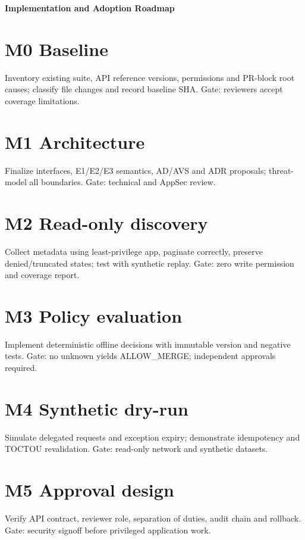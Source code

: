 \documentclass[11pt,letterpaper]{article}
\begin{document}
\begin{center}
{\LARGE\bfseries Implementation and Adoption Roadmap}\par
\vspace{5pt}{\large Sequenced gates from documentation to controlled pilot}\par
\vspace{9pt}{\small Engineering reference | Proposed design | Not a deployment or approval record}\par
\end{center}
\tableofcontents
\clearpage
\section{M0 Baseline}
Inventory existing suite, API reference versions, permissions and PR-block root causes; classify file changes and record baseline SHA. Gate: reviewers accept coverage limitations.


\section{M1 Architecture}
Finalize interfaces, E1/E2/E3 semantics, AD/AVS and ADR proposals; threat-model all boundaries. Gate: technical and AppSec review.


\section{M2 Read-only discovery}
Collect metadata using least-privilege app, paginate correctly, preserve denied/truncated states; test with synthetic replay. Gate: zero write permission and coverage report.


\section{M3 Policy evaluation}
Implement deterministic offline decisions with immutable version and negative tests. Gate: no unknown yields ALLOW\_MERGE; independent approvals required.


\section{M4 Synthetic dry-run}
Simulate delegated requests and exception expiry; demonstrate idempotency and TOCTOU revalidation. Gate: read-only network and synthetic datasets.


\section{M5 Approval design}
Verify API contract, reviewer role, separation of duties, audit chain and rollback. Gate: security signoff before privileged application work.
\end{document}
